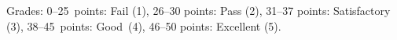 \documentclass[a4paper,12pt]{letter}
\begin{document}

Grades: 0–25~points: Fail (1), 26–30 points: Pass (2), 31–37 points: Satisfactory (3), 38–45~points: Good~(4), 46–50 points: Excellent (5).


\vfill
\end{document}
